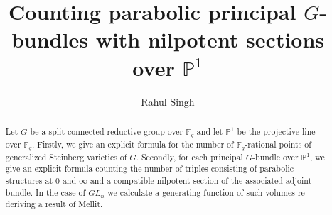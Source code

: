 \documentclass{amsart}
\title{Counting parabolic principal $G$-bundles
with nilpotent sections over $\mathbb{P}^1$}
\author{Rahul Singh}
\date{}
\theoremstyle{plain}
\theoremstyle{definition}
\theoremstyle{remark}
\begin{document}
\begin{abstract}
Let $G$ be a split connected reductive group over $\mathbb{F}_q$ and let $\mathbb{P}^1$ be the projective line over $\mathbb{F}_q$. Firstly, we give an explicit formula for the number of $\mathbb{F}_{q}$-rational points of generalized Steinberg varieties of $G$. Secondly, for each principal $G$-bundle over $\mathbb{P}^1$, we give an explicit formula counting the number of triples consisting of parabolic structures at $0$ and $\infty$ and a compatible nilpotent section of the associated adjoint bundle. In the case of $GL_{n}$ we calculate a generating function of such volumes re-deriving a result of Mellit.
\end{abstract}
\maketitle
\renewcommand\abstractname{\textbf{Abstract}}
\tableofcontents
\end{document}
